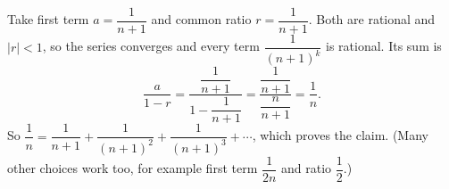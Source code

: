 Take first term $a=\dfrac{1}{n+1}$ and common ratio $r=\dfrac{1}{n+1}$. Both are rational and $|r|<1$, so the series converges and every term $\dfrac{1}{(n+1)^k}$ is rational. Its sum is
\[
\dfrac{a}{1-r}=\dfrac{\dfrac{1}{n+1}}{1-\dfrac{1}{n+1}}=\dfrac{\dfrac{1}{n+1}}{\dfrac{n}{n+1}}=\dfrac{1}{n} .
\]
So $\dfrac{1}{n}=\dfrac{1}{n+1}+\dfrac{1}{(n+1)^2}+\dfrac{1}{(n+1)^3}+\cdots$, which proves the claim. (Many other choices work too, for example first term $\dfrac{1}{2n}$ and ratio $\dfrac{1}{2}$.)
